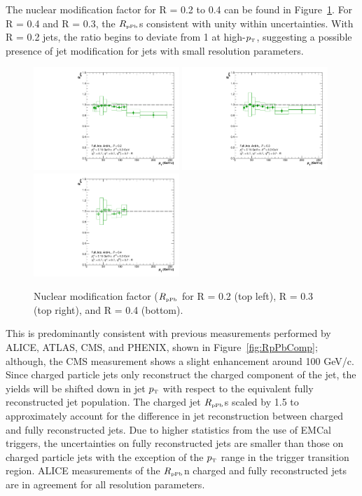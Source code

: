 \documentclass[ALICE]{ALICE_analysis_notes}
\newcommand{\pT}{$p_{\mbox{\tiny T}}$\xspace}
\newcommand{\RpPb}{\texorpdfstring{$R_{\text{\tiny pPb}}$}\xspace\xspace}
\begin{document}
The nuclear modification factor for R = 0.2 to 0.4 can be found in Figure~\ref{fig:finalRpPb}. For R = 0.4 and R = 0.3, the \RpPb is consistent with unity within uncertainties. With R = 0.2 jets, the ratio begins to deviate from 1 at high-\pT, suggesting a possible presence of jet modification for jets with small resolution parameters.

\begin{figure}[hbt!]
    \centering
    \includegraphics[width=0.49\textwidth]{figures/pPbFigures/RpPb/ptscheme/RpPb_R02.pdf}
    \includegraphics[width=0.49\textwidth]{figures/pPbFigures/RpPb/ptscheme/RpPb_R03.pdf}
    \includegraphics[width=0.49\textwidth]{figures/pPbFigures/RpPb/ptscheme/RpPb_R04.pdf}
    \caption{Nuclear modification factor (\RpPb) for R = 0.2 (top left), R = 0.3 (top right), and R = 0.4 (bottom).}
    \label{fig:finalRpPb}
\end{figure}

This is predominantly consistent with previous measurements performed by ALICE, ATLAS, CMS, and PHENIX, shown in Figure~\ref{fig:RpPbComp}; although, the CMS measurement shows a slight enhancement around 100 GeV/c. Since charged particle jets only reconstruct the charged component of the jet, the yields will be shifted down in jet \pT with respect to the equivalent fully reconstructed jet population. The charged jet \RpPb is scaled by 1.5 to approximately account for the difference in jet reconstruction between charged and fully reconstructed jets. Due to higher statistics from the use of EMCal triggers, the uncertainties on fully reconstructed jets are smaller than those on charged particle jets with the exception of the \pT range in the trigger transition region. ALICE measurements of the \RpPb in charged and fully reconstructed jets are in agreement for all resolution parameters.
\end{document}
